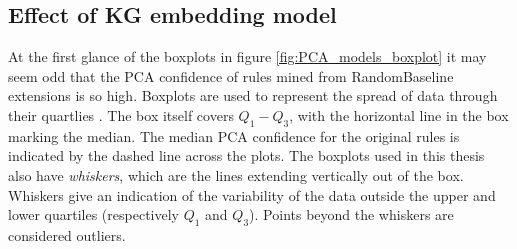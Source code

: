 \subsection{Effect of KG embedding model}
At the first glance of the boxplots in figure \ref{fig:PCA_models_boxplot} it may seem odd that the PCA confidence of rules mined from RandomBaseline extensions is so high. Boxplots are used to represent the spread of data through their quartlies \cite{dutoit2012graphical}. The box itself covers $Q_1-Q_3$, with the horizontal line in the box marking the median. The median PCA confidence for the original rules is indicated by the dashed line across the plots. The boxplots used in this thesis also have \textit{whiskers}, which are the lines extending vertically out of the box. Whiskers give an indication of the variability of the data outside the upper and lower quartiles (respectively $Q_1$ and $Q_3$). Points beyond the whiskers are considered outliers.

